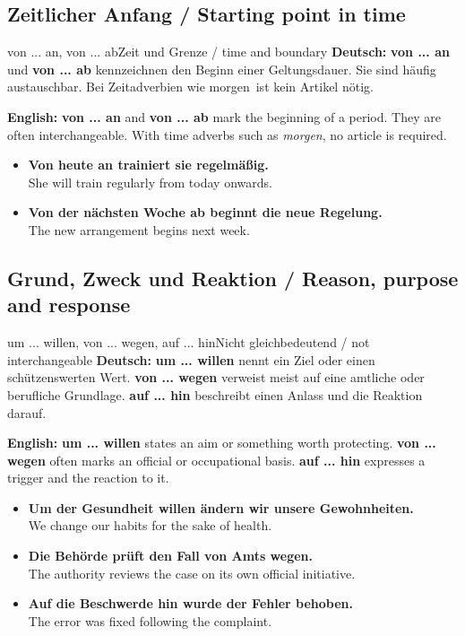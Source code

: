 \documentclass[a4paper,11pt]{article}
\newcommand{\GermanText}[1]{\textbf{Deutsch: }#1\par}
\newcommand{\EnglishText}[1]{{\small\color{SoftGray}\textbf{English: }#1\par}}
\newcommand{\ExampleItem}[2]{\item \textbf{#1}\\{\small\color{SoftGray}#2}}
\begin{document}
\subsection{Zeitlicher Anfang / Starting point in time}
\begin{grammarentry}{von ... an, von ... ab}{Zeit und Grenze / time and boundary}
\GermanText{\textbf{von ... an} und \textbf{von ... ab} kennzeichnen den Beginn einer Geltungsdauer. Sie sind häufig austauschbar. Bei Zeitadverbien wie \glqq morgen\grqq\ ist kein Artikel nötig.}
\EnglishText{\textbf{von ... an} and \textbf{von ... ab} mark the beginning of a period. They are often interchangeable. With time adverbs such as \emph{morgen}, no article is required.}
\end{grammarentry}
\begin{exbox}\begin{itemize}
\ExampleItem{Von heute an trainiert sie regelmäßig.}{She will train regularly from today onwards.}
\ExampleItem{Von der nächsten Woche ab beginnt die neue Regelung.}{The new arrangement begins next week.}
\end{itemize}\end{exbox}

\subsection{Grund, Zweck und Reaktion / Reason, purpose and response}
\begin{grammarentry}{um ... willen, von ... wegen, auf ... hin}{Nicht gleichbedeutend / not interchangeable}
\GermanText{\textbf{um ... willen} nennt ein Ziel oder einen schützenswerten Wert. \textbf{von ... wegen} verweist meist auf eine amtliche oder berufliche Grundlage. \textbf{auf ... hin} beschreibt einen Anlass und die Reaktion darauf.}
\EnglishText{\textbf{um ... willen} states an aim or something worth protecting. \textbf{von ... wegen} often marks an official or occupational basis. \textbf{auf ... hin} expresses a trigger and the reaction to it.}
\end{grammarentry}
\begin{exbox}\begin{itemize}
\ExampleItem{Um der Gesundheit willen ändern wir unsere Gewohnheiten.}{We change our habits for the sake of health.}
\ExampleItem{Die Behörde prüft den Fall von Amts wegen.}{The authority reviews the case on its own official initiative.}
\ExampleItem{Auf die Beschwerde hin wurde der Fehler behoben.}{The error was fixed following the complaint.}
\end{itemize}\end{exbox}
\end{document}
